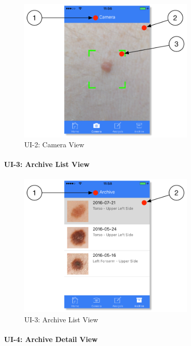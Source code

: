                 \begin{figure}[H]
                    \centering
                    \includegraphics[height=7cm]{assets/GUI/CAMERA_01.pdf}
                    \caption{UI-2: Camera View}
                    \label{fig:ui-2}
                \end{figure}

            \paragraph{UI-3: Archive List View}

                \begin{figure}[H]
                    \centering
                    \includegraphics[height=7cm]{assets/GUI/ARCHIVE_01.pdf}
                    \caption{UI-3: Archive List View}
                    \label{fig:ui-3}
                \end{figure}

            \paragraph{UI-4: Archive Detail View}

